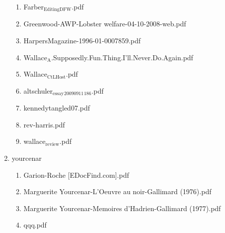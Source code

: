 \documentclass[11pt]{article}
\begin{document}
\begin{enumerate}
\begin{enumerate}
\item Farber$_{\text{EditingDFW}}$.pdf
\label{sec-1-1-1-1-28-34-2}

\item Greenwood-AWP-Lobster welfare-04-10-2008-web.pdf
\label{sec-1-1-1-1-28-34-3}

\item HarpersMagazine-1996-01-0007859.pdf
\label{sec-1-1-1-1-28-34-4}

\item Wallace$_{\text{A}}$.Supposedly.Fun.Thing.I'll.Never.Do.Again.pdf
\label{sec-1-1-1-1-28-34-5}

\item Wallace$_{\text{CtLHost}}$.pdf
\label{sec-1-1-1-1-28-34-6}

\item altschuler$_{\text{essay}}$$_{\text{20090911}}$$_{\text{186}}$.pdf
\label{sec-1-1-1-1-28-34-7}

\item kennedytangled07.pdf
\label{sec-1-1-1-1-28-34-8}

\item rev-harris.pdf
\label{sec-1-1-1-1-28-34-9}

\item wallace$_{\text{review}}$.pdf
\label{sec-1-1-1-1-28-34-10}
\end{enumerate}

\item yourcenar
\label{sec-1-1-1-1-28-35}
\begin{enumerate}
\item Garion-Roche [EDocFind.com].pdf
\label{sec-1-1-1-1-28-35-1}

\item Marguerite Yourcenar-L'Oeuvre au noir-Gallimard (1976).pdf
\label{sec-1-1-1-1-28-35-2}

\item Marguerite Yourcenar-Memoires d'Hadrien-Gallimard (1977).pdf
\label{sec-1-1-1-1-28-35-3}

\item qqq.pdf
\label{sec-1-1-1-1-28-35-4}
\end{enumerate}
\end{enumerate}
\end{document}
